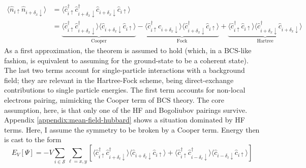 \[
\begin{aligned}
	\langle 
	\hat n_{i\uparrow} \hat n_{i + \delta_x \downarrow}
	\rangle &= \langle 
	\hat c_{i\uparrow}^\dagger \hat c_{i + \delta_x \downarrow}^\dagger \hat c_{i + \delta_x \downarrow} \hat c_{i\uparrow} 
	\rangle \\
	&= 
	\underbrace{
		\langle 
			\hat c_{i\uparrow}^\dagger \hat c_{i + \delta_x \downarrow}^\dagger
		\rangle \langle	
			\hat c_{i + \delta_x \downarrow} \hat c_{i\uparrow} 
		\rangle 
	}_{\text{Cooper}}
	- 
	\underbrace{
		\langle 
			\hat c_{i\uparrow}^\dagger \hat c_{i + \delta_x \downarrow}
		\rangle \langle	
			\hat c_{i + \delta_x \downarrow}^\dagger \hat c_{i\uparrow} 
		\rangle 
	}_{\text{Fock}}
	+ 
	\underbrace{
		\langle 
			\hat c_{i\uparrow}^\dagger \hat c_{i\uparrow}
		\rangle \langle	
			\hat c_{i + \delta_x \downarrow}^\dagger \hat c_{i + \delta_x \downarrow} 
		\rangle
	}_{\text{Hartree}}
\end{aligned}
\]
As a first approximation, the theorem is assumed to hold (which, in a $\mathrm{BCS}$-like fashion, is equivalent to assuming for the ground-state to be a coherent state). The last two terms account for single-particle interactions with a background field; they are relevant in the Hartree-Fock scheme, being direct-exchange contributions to single particle energies. The first term accounts for non-local electrons pairing, mimicking the Cooper term of $\mathrm{BCS}$ theory. The core assumption, here, is that only one of the HF and Bogoliubov pairings survive. Appendix \ref{appendix:mean-field-hubbard} shows a situation dominated by HF terms. Here, I assume the symmetry to be broken by a Cooper term. Energy then is cast to the form
\[
	E_V[\Psi] = -V \sum_{i \in \mathcal{S}} \sum_{\ell = x,y}
	\left[
		\langle
			\hat c_{i\uparrow}^\dagger \hat c_{i + \delta_\ell \downarrow}^\dagger
		\rangle \langle	
			\hat c_{i + \delta_\ell \downarrow} \hat c_{i\uparrow} 
		\rangle + \langle 
			\hat c_{i\uparrow}^\dagger \hat c_{i - \delta_\ell \downarrow}^\dagger
		\rangle \langle	
			\hat c_{i - \delta_\ell \downarrow} \hat c_{i\uparrow} 
		\rangle
	\right]
\]

